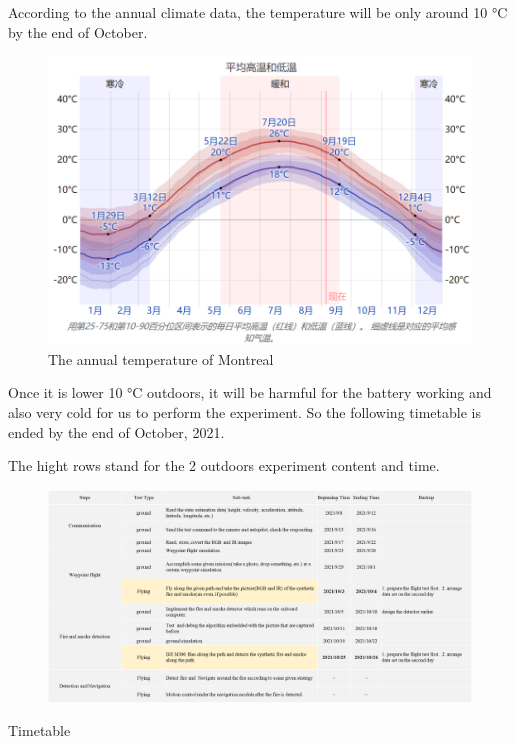 \documentclass{report}
\begin{document}
According to the annual climate data, the temperature will be only around 10 °C
by the end of October.
\begin{figure}[H]
    \centering
    \includegraphics[width=1\textwidth]{climate}
    \caption{The annual temperature of Montreal}
\end{figure}

Once it is lower 10 °C outdoors, it will be harmful for the battery working and also
very cold for us to perform the experiment. So the following timetable is ended
by the end of October, 2021.

The hight rows stand for the 2 outdoors experiment content and time.

\begin{table}
    \begin{figure}[H]
        \centering
        \includegraphics[width=1.2\textheight]{timetable}
    \end{figure}
    \caption{Timetable}
    \label{fig_timetable}
\end{table}
\end{document}
